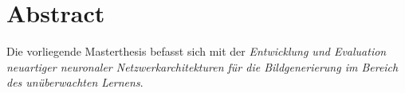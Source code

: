 \section*{Abstract}

Die vorliegende Masterthesis befasst sich mit der \textit{Entwicklung und Evaluation neuartiger neuronaler Netzwerkarchitekturen für die Bildgenerierung im Bereich des unüberwachten Lernens}.






